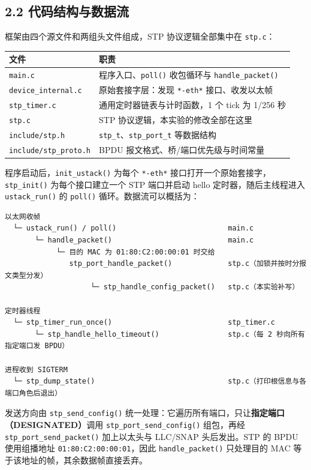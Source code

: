 \documentclass[UTF8,12pt,a4paper,fontset=fandol]{ctexart}
\begin{document}
\subsection*{2.2 代码结构与数据流}

框架由四个源文件和两组头文件组成，STP 协议逻辑全部集中在 \texttt{stp.c}：

{\small\setlength{\parindent}{0pt}
\begin{tabular}{@{}L{0.24\textwidth}L{0.70\textwidth}@{}}
\toprule
{}\textbf{文件} & \textbf{职责}\\
\midrule
\texttt{main.c} & 程序入口、\texttt{poll()} 收包循环与 \texttt{handle\_packet()}\\
\texttt{device\_internal.c} & 原始套接字层：发现 \texttt{*-eth*} 接口、收发以太帧\\
\texttt{stp\_timer.c} & 通用定时器链表与计时函数，1 个 tick 为 1/256 秒\\
\texttt{stp.c} & STP 协议逻辑，本实验的修改全部在这里\\
\texttt{include/stp.h} & \texttt{stp\_t}、\texttt{stp\_port\_t} 等数据结构\\
\texttt{include/stp\_proto.h} & BPDU 报文格式、桥/端口优先级与时间常量\\
\bottomrule
\end{tabular}}

程序启动后，\texttt{init\_ustack()} 为每个 \texttt{*-eth*} 接口打开一个原始套接字，\texttt{stp\_init()} 为每个接口建立一个 STP 端口并启动 hello 定时器，随后主线程进入 \texttt{ustack\_run()} 的 \texttt{poll()} 循环。数据流可以概括为：

\begin{verbatim}
以太网收帧
  └─ ustack_run() / poll()                          main.c
       └─ handle_packet()                           main.c
            └─ 目的 MAC 为 01:80:C2:00:00:01 时交给
               stp_port_handle_packet()             stp.c（加锁并按时分报文类型分发）
                    └─ stp_handle_config_packet()   stp.c（本实验补写）

定时器线程
  └─ stp_timer_run_once()                           stp_timer.c
       └─ stp_handle_hello_timeout()                stp.c（每 2 秒向所有指定端口发 BPDU）

进程收到 SIGTERM
  └─ stp_dump_state()                               stp.c（打印根信息与各端口角色后退出）
\end{verbatim}

发送方向由 \texttt{stp\_send\_config()} 统一处理：它遍历所有端口，只让\textbf{指定端口（\mbox{DESIGNATED}）}调用 \texttt{stp\_port\_send\_config()} 组包，再经 \texttt{stp\_port\_send\_packet()} 加上以太头与 LLC/SNAP 头后发出。STP 的 BPDU 使用组播地址 \texttt{01:80:C2:00:00:01}，因此 \texttt{handle\_packet()} 只处理目的 MAC 等于该地址的帧，其余数据帧直接丢弃。
\end{document}
